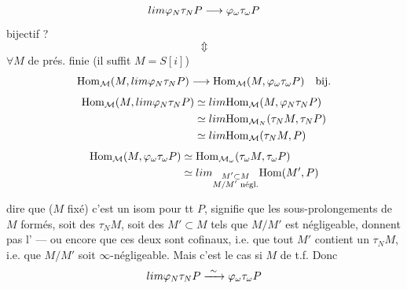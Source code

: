\documentclass[11pt,a4paper]{article}
\begin{document}
\[
  \varinjlim \varphi_N \tau_N P \longrightarrow \varphi_\omega \tau_\omega P
\]
 bijectif ?
\[
  \Updownarrow
\]
$\forall M$ de prés. finie (il suffit $M = S[i]$)
\[
  \mathrm{Hom}_{\mathcal{M}}(M, \varinjlim \varphi_N \tau_N P) \longrightarrow \mathrm{Hom}_{\mathcal{M}}(M, \varphi_\omega \tau_\omega P) \quad \text{bij.}
\]
\begin{align*}
  \mathrm{Hom}_{\mathcal{M}}(M, \varinjlim \varphi_N \tau_N P)
  &\simeq \varinjlim \mathrm{Hom}_{\mathcal{M}}(M, \varphi_N \tau_N P) \\
  &\simeq \varinjlim \mathrm{Hom}_{\mathcal{M}_N}(\tau_N M, \tau_N P) \\
  &\simeq \varinjlim \mathrm{Hom}_{\mathcal{M}}(\tau_N M, P)
\end{align*}
\begin{align*}
  \mathrm{Hom}_{\mathcal{M}}(M, \varphi_\omega \tau_\omega P)
  &\simeq \mathrm{Hom}_{\mathcal{M}_\omega}(\tau_\omega M, \tau_\omega P) \\
  &\simeq \varinjlim_{\substack{M' \subset M \\ M/M' \text{ négl.}}} \mathrm{Hom}(M', P)
\end{align*}

dire que  ($M$ fixé) c'est un isom pour tt $P$, signifie que les sous-prolongements de $M$ formés, soit des $\tau_N M$, soit des $M' \subset M$ tels que $M/M'$ est négligeable,  donnent pas l' --- ou encore que ces deux  sont cofinaux, i.e. que tout $M'$ contient un $\tau_N M$, i.e. que $M/M'$ soit $\infty$-négligeable. Mais c'est le cas si $M$ de t.f. \struck{\ill{}}
Donc
\[
  \varinjlim \varphi_N \tau_N P \xrightarrow{\ \sim\ } \varphi_\omega \tau_\omega P
\]
\end{document}
